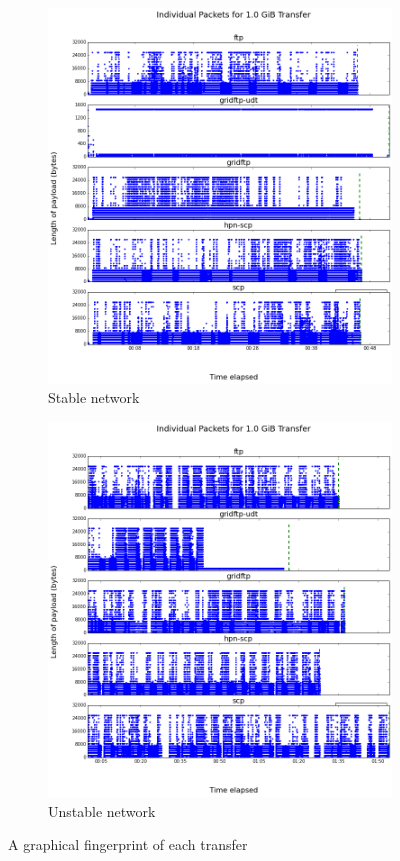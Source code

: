 \documentclass{sig-alternate-05-2015}
\begin{document}
\begin{figure}
\centering
	\begin{subfigure}{.4\textwidth}
	\includegraphics[width=\linewidth]{img/packets/good.png}
	\caption{Stable network}
	\label{fig:good_transfer}
	\end{subfigure}
	\begin{subfigure}{.4\textwidth}
	\includegraphics[width=\linewidth]{img/packets/bad.png}
	\caption{Unstable network}
	\label{fig:bad_transfer}
	\end{subfigure}
\caption{A graphical fingerprint of each transfer}
\label{fig:packets}
\end{figure}
\end{document}
